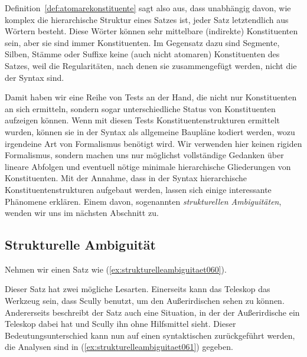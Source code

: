 \Np


Definition~\ref{def:atomarekonstituente} sagt also aus, dass unabhängig davon, wie komplex die hierarchische Struktur eines Satzes ist, jeder Satz letztendlich aus Wörtern besteht.
Diese Wörter können sehr mittelbare (indirekte) Konstituenten sein, aber sie sind immer Konstituenten.
Im Gegensatz dazu sind Segmente, Silben, Stämme oder Suffixe keine (auch nicht atomaren) Konstituenten des Satzes, weil die Regularitäten, nach denen sie zusammengefügt werden, nicht die der Syntax sind.

Damit haben wir eine Reihe von Tests an der Hand, die nicht nur Konstituenten an sich ermitteln, sondern sogar unterschiedliche Status von Konstituenten aufzeigen können.
Wenn mit diesen Tests Konstituentenstrukturen ermittelt wurden, können sie in der Syntax als allgemeine Baupläne kodiert werden, wozu irgendeine Art von Formalismus benötigt wird.
Wir verwenden hier keinen rigiden Formalismus, sondern machen uns nur möglichst vollständige Gedanken über lineare Abfolgen und eventuell nötige minimale hierarchische Gliederungen von Konstituenten.
Mit der Annahme, dass in der Syntax hierarchische Konstituentenstrukturen aufgebaut werden, lassen sich einige interessante Phänomene erklären.
Einem davon, sogenannten \textit{strukturellen Ambiguitäten}, wenden wir uns im nächsten Abschnitt zu.

\subsection{Strukturelle Ambiguität}
\label{sec:strukturelleambiguitaet}

Nehmen wir einen Satz wie (\ref{ex:strukturelleambiguitaet060}).

\begin{exe}
\end{exe}

Dieser Satz hat zwei mögliche Lesarten.
Einerseits kann das Teleskop das Werkzeug sein, dass Scully benutzt, um den Außerirdischen sehen zu können.
Andererseits beschreibt der Satz auch eine Situation, in der der Außerirdische ein Teleskop dabei hat und Scully ihn ohne Hilfsmittel sieht.
Dieser Bedeutungsunterschied kann nun auf einen syntaktischen zurückgeführt werden, die Analysen sind in (\ref{ex:strukturelleambiguitaet061}) gegeben.

